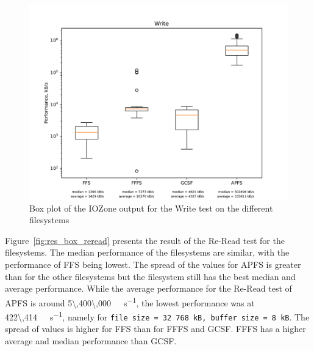 \begin{figure}[!ht]
	\label{fig:res_box_write}
	\begin{center}
		\includegraphics[width=1.0\textwidth]{figures.nosync/benchmarking/Write_box.pdf}
	\end{center}
	\caption{Box plot of the IOZone output for the Write test on the different filesystems}
\end{figure}

\FloatBarrier

Figure~\ref{fig:res_box_reread} presents the result of the \mbox{Re-Read} test for the filesystems. The median performance of the filesystems are similar, with the performance of \gls{FFS} being lowest. The spread of the values for \gls{APFS} is greater than for the other filesystems but the filesystem still has the best median and average performance. While the average performance for the Re-Read test of \gls{APFS} is around \SI[per-mode = symbol]{5\,400\,000}{\kilo\byte\per\second}, the lowest performance was at \SI[per-mode = symbol]{422\,414}{\kilo\byte\per\second}, namely for \texttt{file size = 32\,768\,kB, buffer size = 8\,kB}. The spread of values is higher for \gls{FFS} than for \gls{FFFS} and \gls{GCSF}. \gls{FFFS} has a higher average and median performance than \gls{GCSF}.

